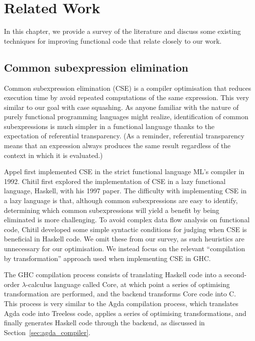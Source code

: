 \chapter{Related Work}
\label{cha:related_work}

In this chapter, we provide a survey of the literature and discuss some existing techniques for improving functional code that relate closely to our work.

\section{Common subexpression elimination}

Common subexpression elimination (CSE) is a compiler optimisation that reduces execution time by avoid repeated computations of the same expression.\cite{chitil1997} This very similar to our goal with case squashing. As anyone familiar with the nature of purely functional programming languages might realize, identification of common subexpressions is much simpler in a functional language thanks to the expectation of referential transparency.\cite{chitil1997} (As a reminder, referential transparency means that an expression always produces the same result regardless of the context in which it is evaluated.)

Appel first implemented CSE in the strict functional language ML's compiler in 1992.\cite{appel1992} Chitil first explored the implementation of CSE in a lazy functional language, Haskell, with his 1997 paper.\cite{chitil1997} The difficulty with implementing CSE in a lazy language is that, although common subexpressions are easy to identify, determining which common subexpressions will yield a benefit by being eliminated is more challenging. To avoid complex data flow analysis on functional code, Chitil developed some simple syntactic conditions for judging when CSE is beneficial in Haskell code.\cite{chitil1997} We omit these from our survey, as such heuristics are unnecessary for our optimisation. We instead focus on the relevant ``compilation by transformation'' approach used when implementing CSE in GHC.

The GHC compilation process consists of translating Haskell code into a second-order $\lambda$-calculus language called Core, at which point a series of optimising transformation are performed, and the backend transforms Core code into C.\cite{chitil1997} This process is very similar to the Agda compilation process, which translates Agda code into Treeless code, applies a series of optimising transformations, and finally generates Haskell code through the backend, as discussed in Section~\ref{sec:agda_compiler}.

